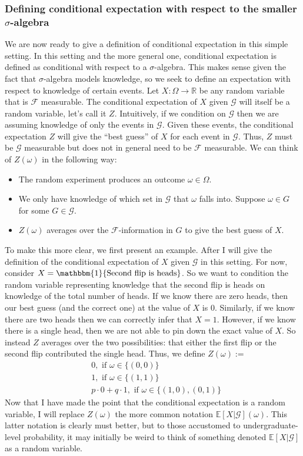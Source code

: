 \documentclass[12pt]{article}
\newcommand{\E}{\mathbb{E}}
\newcommand{\R}{\mathbb{R}}
\begin{document}
\subsubsection{Defining conditional expectation with respect to the smaller $\sigma$-algebra}
We are now ready to give a definition of conditional expectation in this simple setting. In this setting and the more general one, conditional expectation is defined as conditional with respect to a $\sigma$-algebra. This makes sense given the fact that $\sigma$-algebra models knowledge, so we seek to define an expectation with respect to knowledge of certain events. Let $X: \Omega \to \R$ be any random variable that is $\mathcal{F}$ measurable. 
The conditional expectation of $X$ given $\mathcal{G}$ will itself be a random variable, let's call it $Z$. Intuitively, if we condition on $\mathcal{G}$ then we are assuming knowledge of only the events in $\mathcal{G}$. Given 
these events, the conditional expectation $Z$ will give the ``best guess'' of $X$ for each event in $\mathcal{G}$. Thus, $Z$ must be $\mathcal{G}$ measurable but does not in general need to be $\mathcal{F}$ measurable. 
We can think of $Z(\omega)$ in the following way: 
\begin{itemize}
\item The random experiment produces an outcome $\omega \in \Omega$. 
\item We only have knowledge of which set in $\mathcal{G}$ that $\omega$ falls into. Suppose $\omega \in G$ for some $G \in \mathcal{G}$. 
\item $Z(\omega)$ averages over the $\mathcal{F}$-information in $G$ to give the best guess of $X$. 
\end{itemize}
To make this more clear, we first present an example. After I will give the definition of the conditional expectation of $X$ given $\mathcal{G}$ in this setting. For now, consider 
$X = \mathbbm{1}\{\text{Second flip is heads}\}$. So we want to condition the random variable representing knowledge that the second flip is heads on knowledge of the total number of heads.
If we know there are zero heads, then our best guess (and the correct one) at the value of $X$ is $0$. Similarly, if we know there are two heads then we can correctly infer that $X = 1$. However, 
if we know there is a single head, then we are not able to pin down the exact value of $X$. So instead $Z$ averages over the two possibilities: that either the first flip or the second flip contributed the 
single head. Thus, we define $Z(\omega) := $
\begin{align*}
&0, \text{ if } \omega \in \{(0, 0)\} \\
&1, \text{ if } \omega \in \{(1, 1)\} \\
&p \cdot 0 + q \cdot 1, \text{ if } \omega \in \{(1, 0), (0, 1)\}
\end{align*}
Now that I have made the point that the conditional expectation is a random variable, I will replace $Z(\omega)$ the more common notation $\E[X|\mathcal{G}](\omega)$. This latter notation is clearly must better, 
but to those accustomed to undergraduate-level probability, it may initially be weird to think of something denoted $\E[X|\mathcal{G}]$ as a random variable. 
\end{document}
